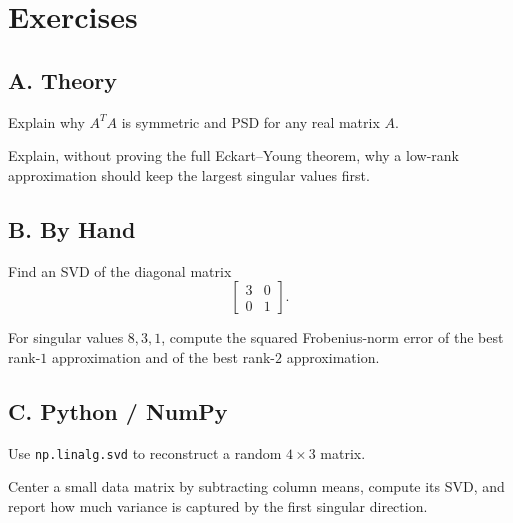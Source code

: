 \section*{Exercises}

\subsection*{A. Theory}

\begin{exercise}
Explain why $A^TA$ is symmetric and PSD for any real matrix $A$.
\end{exercise}

\begin{exercise}
Explain, without proving the full Eckart--Young theorem, why a low-rank
approximation should keep the largest singular values first.
\end{exercise}

\subsection*{B. By Hand}

\begin{exercise}
Find an SVD of the diagonal matrix
\[
  \begin{bmatrix}3&0\\0&1\end{bmatrix}.
\]
\end{exercise}

\begin{exercise}
For singular values $8,3,1$, compute the squared Frobenius-norm error of the
best rank-$1$ approximation and of the best rank-$2$ approximation.
\end{exercise}

\subsection*{C. Python / NumPy}

\begin{exercise}
Use \texttt{np.linalg.svd} to reconstruct a random $4\times 3$ matrix.
\end{exercise}

\begin{exercise}
Center a small data matrix by subtracting column means, compute its SVD, and
report how much variance is captured by the first singular direction.
\end{exercise}

